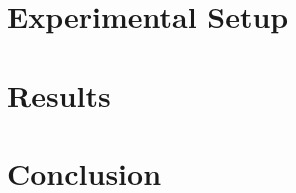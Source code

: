 \documentclass{article}
\begin{document}

\section{Experimental Setup}

\section{Results}

\section{Conclusion}
\end{document}
